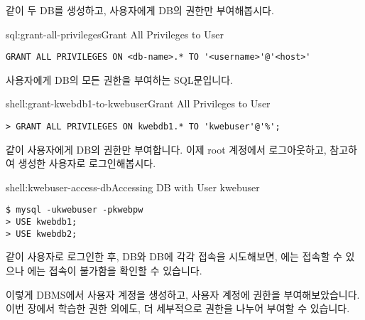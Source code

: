 \와 같이 두 DB를 생성하고,  사용자에게  DB의 권한만 부여해봅시다.

\begin{sqlenv}{sql:grant-all-privileges}{Grant All Privileges to User}\begin{verbatim}
GRANT ALL PRIVILEGES ON <db-name>.* TO '<username>'@'<host>'
\end{verbatim}
\end{sqlenv}

\는 사용자에게  DB의 모든 권한을 부여하는 SQL문입니다.

\begin{shellenv}{shell:grant-kwebdb1-to-kwebuser}{Grant All Privileges to User }\begin{verbatim}
> GRANT ALL PRIVILEGES ON kwebdb1.* TO 'kwebuser'@'%';
\end{verbatim}
\end{shellenv}

\와 같이  사용자에게  DB의 권한만 부여합니다. 이제 root 계정에서 로그아웃하고, \을 참고하여 생성한  사용자로 로그인해봅시다.

\begin{shellenv}{shell:kwebuser-access-db}{Accessing DB with User kwebuser}\begin{verbatim}
$ mysql -ukwebuser -pkwebpw
> USE kwebdb1;
> USE kwebdb2;
\end{verbatim}
\end{shellenv}

\와 같이  사용자로 로그인한 후,  DB와  DB에 각각 접속을 시도해보면, 에는 접속할 수 있으나 에는 접속이 불가함을 확인할 수 있습니다.

이렇게 DBMS에서 사용자 계정을 생성하고, 사용자 계정에 권한을 부여해보았습니다. 이번 장에서 학습한 권한 외에도, 더 세부적으로 권한을 나누어 부여할 수 있습니다.
